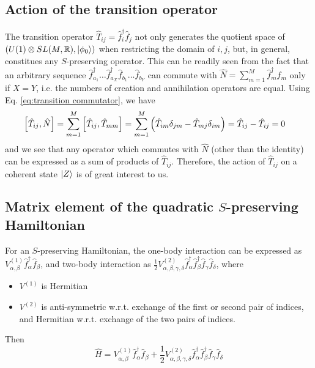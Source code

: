 \documentclass[12pt]{article}
\newcommand{\hc}{^\dagger}
\begin{document}
	
	
	\subsection{Action of the transition operator}
	
	The transition operator $\hat{T}_{ij}=\hat{f}\hc_i\hat{f}_j$ not only generates the quotient space of $(U(1)\otimes SL(M,\mathbb{R}), \ket{\phi_0})$ when restricting the domain of $i,j$, but, in general, constitues any $S$-preserving operator. This can be readily seen from the fact that an arbitrary sequence $\hat{f}\hc_{a_1}\dots\hat{f}\hc_{a_X}\hat{f}_{b_1}\dots\hat{f}_{b_Y}$ can commute with $\hat{N}=\sum_{m=1}^M\hat{f}\hc_m\hat{f}_m$ only if $X=Y$, i.e. the numbers of creation and annihilation operators are equal. Using Eq. \ref{eq:transition commutator}, we have
	\begin{align}\label{eq:transition commutes with N}
	\comm{\hat{T}_{ij}}{\hat{N}}&=\sum_{m=1}^M\comm{\hat{T}_{ij}}{\hat{T}_{mm}}=\sum_{m=1}^M\left(\hat{T}_{im}\delta_{jm}-\hat{T}_{mj}\delta_{im}\right)=\hat{T}_{ij}-\hat{T}_{ij}=0
	\end{align}
	and we see that any operator which commutes with $\hat{N}$ (other than the identity) can be expressed as a sum of products of $\hat{T}_{ij}$. Therefore, the action of $\hat{T}_{ij}$ on a coherent state $\ket{Z}$ is of great interest to us.
	
	\subsection{Matrix element of the quadratic $S$-preserving Hamiltonian}
	For an $S$-preserving Hamiltonian, the one-body interaction can be expressed as $V^{(1)}_{\alpha,\beta}\hat{f}\hc_\alpha\hat{f}_\beta$, and two-body interaction as $\frac{1}{2}V^{(2)}_{\alpha,\beta,\gamma,\delta}\hat{f}\hc_\alpha\hat{f}\hc_\beta\hat{f}_\gamma\hat{f}_\delta$, where
	\begin{itemize}
	\item $V^{(1)}$ is Hermitian
	\item $V^{(2)}$ is anti-symmetric w.r.t. exchange of the first or second pair of indices, and Hermitian w.r.t. exchange of the two pairs of indices.
	\end{itemize}
	Then
	\begin{equation}
	\hat{H}=V^{(1)}_{\alpha,\beta}\hat{f}\hc_\alpha\hat{f}_\beta+\frac{1}{2}V^{(2)}_{\alpha,\beta,\gamma,\delta}\hat{f}\hc_\alpha\hat{f}\hc_\beta\hat{f}_\gamma\hat{f}_\delta
	\end{equation}
	
\end{document}
